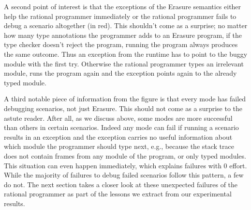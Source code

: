 A second point of interest is that the exceptions of
the Erasure semantics either help the rational programmer immediately or 
the rational programmer fails to debug a scenario altogether (in red). This shouldn't
come as a surprise; no matter how many type annotations the programmer
adds to an Erasure program, if the type checker doesn't reject the
program, running the program always produces the same outcome. Thus an
exception from the runtime has to point to the buggy module with
the first try. Otherwise the rational programmer types an irrelevant
module, runs the program again and the exception points again to the
already typed module. 

A third notable piece of information from
the figure is that every mode has failed debugging scenarios, not just
Erasure. This should
not come as a surprise to the astute
reader. After all, as we
discuss above, some modes are more successful than others in certain
scenarios. Indeed any mode can fail if running a scenario results in an
exception and the exception carries no useful information about which
module the programmer should type next, e.g., because the stack trace 
does not contain frames from any module of the program, or only typed modules. This situation
can even happen immediately, which explains failures with 0 effort. 
While the majority of
failures to debug failed scenarios follow this pattern, a few do not. The next section takes a
closer look at these unexpected failures of the rational programmer as part of the lessons we
extract from our experimental results.

